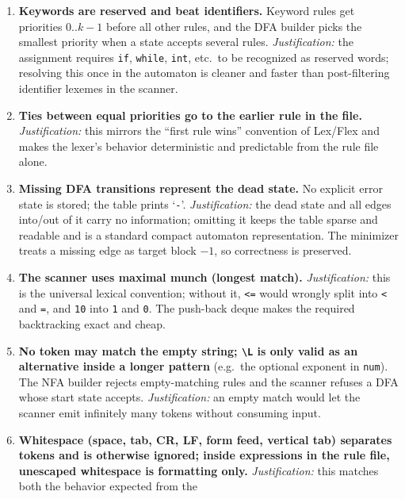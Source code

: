 \documentclass[11pt,a4paper]{article}
\begin{document}
\begin{enumerate}
    \item \textbf{Keywords are reserved and beat identifiers.} Keyword rules get
          priorities $0..k-1$ before all other rules, and the DFA builder picks
          the smallest priority when a state accepts several rules.
          \emph{Justification:} the assignment requires \texttt{if},
          \texttt{while}, \texttt{int}, etc.\ to be recognized as reserved words;
          resolving this once in the automaton is cleaner and faster than
          post-filtering identifier lexemes in the scanner.
    \item \textbf{Ties between equal priorities go to the earlier rule in the
          file.} \emph{Justification:} this mirrors the ``first rule wins''
          convention of Lex/Flex and makes the lexer's behavior deterministic
          and predictable from the rule file alone.
    \item \textbf{Missing DFA transitions represent the dead state.} No explicit
          error state is stored; the table prints `\texttt{-}'.
          \emph{Justification:} the dead state and all edges into/out of it carry
          no information; omitting it keeps the table sparse and readable and is
          a standard compact automaton representation. The minimizer treats a
          missing edge as target block $-1$, so correctness is preserved.
    \item \textbf{The scanner uses maximal munch (longest match).}
          \emph{Justification:} this is the universal lexical convention; without
          it, \texttt{<=} would wrongly split into \texttt{<} and \texttt{=},
          and \texttt{10} into \texttt{1} and \texttt{0}. The push-back deque
          makes the required backtracking exact and cheap.
    \item \textbf{No token may match the empty string; \texttt{\textbackslash L}
          is only valid as an alternative inside a longer pattern} (e.g.\ the
          optional exponent in \texttt{num}). The NFA builder rejects
          empty-matching rules and the scanner refuses a DFA whose start state
          accepts. \emph{Justification:} an empty match would let the scanner
          emit infinitely many tokens without consuming input.
    \item \textbf{Whitespace (space, tab, CR, LF, form feed, vertical tab)
          separates tokens and is otherwise ignored; inside expressions in the
          rule file, unescaped whitespace is formatting only.}
          \emph{Justification:} this matches both the behavior expected from the

\end{enumerate}
\end{document}
